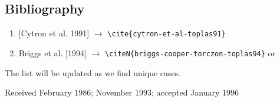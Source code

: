 \documentclass[hyperref]{acmtrans2e}
\begin{document}
\subsection{Bibliography}

\begin{enumerate}
\item{[Cytron et al. 1991]} $\rightarrow$ \verb|\cite{cytron-et-al-toplas91}|
\item{Briggs et al. [1994]} $\rightarrow$ \verb|\citeN{briggs-cooper-torczon-toplas94}| or
\end{enumerate}
\noindent
The list will be updated as we find unique cases.



\begin{received}
Received February 1986;
November 1993;
accepted January 1996
\end{received}
\end{document}
